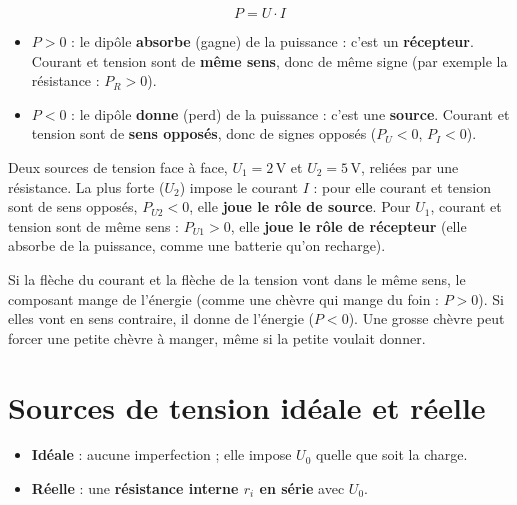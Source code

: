 \begin{defnbox}[title=Signe de la puissance (convention suisse)]
\[ P = U\cdot I \]
\begin{itemize}
  \item $P > 0$ : le dipôle \textbf{absorbe} (gagne) de la puissance : c'est un
        \textbf{récepteur}. Courant et tension sont de \textbf{même sens}, donc de même
        signe (par exemple la résistance : $P_R > 0$).
  \item $P < 0$ : le dipôle \textbf{donne} (perd) de la puissance : c'est une
        \textbf{source}. Courant et tension sont de \textbf{sens opposés}, donc de signes
        opposés ($P_U < 0$, $P_I < 0$).
\end{itemize}
\end{defnbox}

\begin{exbox}[title=Attention : une source peut être récepteur]
Deux sources de tension face à face, $U_1 = 2$\,V et $U_2 = 5$\,V, reliées par une
résistance. La plus forte ($U_2$) impose le courant $I$ : pour elle courant et tension sont
de sens opposés, $P_{U2} < 0$, elle \textbf{joue le rôle de source}. Pour $U_1$, courant et
tension sont de même sens : $P_{U1} > 0$, elle \textbf{joue le rôle de récepteur} (elle
absorbe de la puissance, comme une batterie qu'on recharge).
\end{exbox}

\begin{goatbox}
Si la flèche du courant et la flèche de la tension vont dans le même sens, le composant
\og mange\fg{} de l'énergie (comme une chèvre qui mange du foin : $P>0$). Si elles vont en
sens contraire, il \og donne\fg{} de l'énergie ($P<0$). Une grosse chèvre peut forcer une
petite chèvre à manger, même si la petite voulait donner.
\end{goatbox}

\section{Sources de tension idéale et réelle}


\begin{defnbox}[title=Source de tension idéale / réelle]
\begin{itemize}
  \item \textbf{Idéale} : aucune imperfection ; elle impose $U_0$ quelle que soit la charge.
  \item \textbf{Réelle} : une \textbf{résistance interne $r_i$ en série} avec $U_0$.
\end{itemize}
\end{defnbox}

